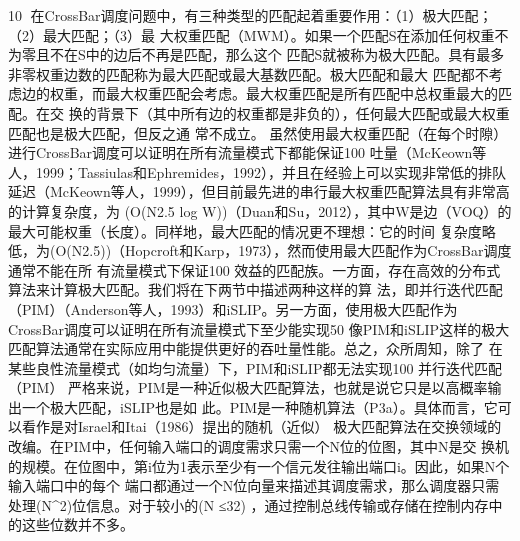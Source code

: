                                                               10
在CrossBar调度问题中，有三种类型的匹配起着重要作用：（1）极大匹配；（2）最大匹配；（3）最
大权重匹配（MWM）。如果一个匹配S在添加任何权重不为零且不在S中的边后不再是匹配，那么这个
匹配S就被称为极大匹配。具有最多非零权重边数的匹配称为最大匹配或最大基数匹配。极大匹配和最大
匹配都不考虑边的权重，而最大权重匹配会考虑。最大权重匹配是所有匹配中总权重最大的匹配。在交
换的背景下（其中所有边的权重都是非负的），任何最大匹配或最大权重匹配也是极大匹配，但反之通
常不成立。
虽然使用最大权重匹配（在每个时隙）进行CrossBar调度可以证明在所有流量模式下都能保证100%
吐量（McKeown等人，1999；Tassiulas和Ephremides，1992），并且在经验上可以实现非常低的排队
延迟（McKeown等人，1999），但目前最先进的串行最大权重匹配算法具有非常高的计算复杂度，为
(O(N{2.5} log W))（Duan和Su，2012），其中W是边（VOQ）的最大可能权重（长度）。同样地，最大匹配的情况更不理想：它的时间
复杂度略低，为(O(N{2.5}))（Hopcroft和Karp，1973），然而使用最大匹配作为CrossBar调度通常不能在所
有流量模式下保证100%
效益的匹配族。一方面，存在高效的分布式算法来计算极大匹配。我们将在下两节中描述两种这样的算
法，即并行迭代匹配（PIM）（Anderson等人，1993）和iSLIP。另一方面，使用极大匹配作为
CrossBar调度可以证明在所有流量模式下至少能实现50%
像PIM和iSLIP这样的极大匹配算法通常在实际应用中能提供更好的吞吐量性能。总之，众所周知，除了
在某些良性流量模式（如均匀流量）下，PIM和iSLIP都无法实现100%
并行迭代匹配（PIM）
严格来说，PIM是一种近似极大匹配算法，也就是说它只是以高概率输出一个极大匹配，iSLIP也是如
此。PIM是一种随机算法（P3a）。具体而言，它可以看作是对Israel和Itai（1986）提出的随机（近似）
极大匹配算法在交换领域的改编。在PIM中，任何输入端口的调度需求只需一个N位的位图，其中N是交
换机的规模。在位图中，第i位为1表示至少有一个信元发往输出端口i。因此，如果N个输入端口中的每个
端口都通过一个N位向量来描述其调度需求，那么调度器只需处理(N^{2})位信息。对于较小的(N ≤32)
，通过控制总线传输或存储在控制内存中的这些位数并不多。




